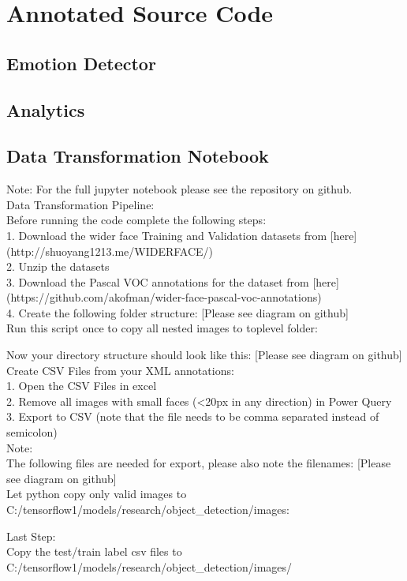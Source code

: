 \section{Annotated Source Code}
\subsection{Emotion Detector}

\subsection{Analytics}

\subsection{Data Transformation Notebook}
Note: For the full jupyter notebook please see the repository on github.\\
Data Transformation Pipeline:\\
Before running the code complete the following steps:\\
1. Download the wider face Training and Validation datasets from  [here](http://shuoyang1213.me/WIDERFACE/)\\
2. Unzip the datasets\\
3. Download the Pascal VOC annotations for the dataset from [here](https://github.com/akofman/wider-face-pascal-voc-annotations)\\
4. Create the following folder structure:
[Please see diagram on github]\\
Run this script once to copy all nested images to toplevel folder:

Now your directory structure should look like this:
[Please see diagram on github]\\
Create CSV Files from your XML annotations:\\

1. Open the CSV Files in excel\\
2. Remove all images with small faces (<20px in any direction) in Power Query\\
3. Export to CSV (note that the file needs to be comma separated instead of semicolon)\\
Note:\\
The following files are needed for export, please also note the filenames:
[Please see diagram on github]\\
Let python copy only valid images to C:/tensorflow1/models/research/object\_detection/images:

Last Step:\\
Copy the test/train label csv files to C:/tensorflow1/models/research/object\_detection/images/